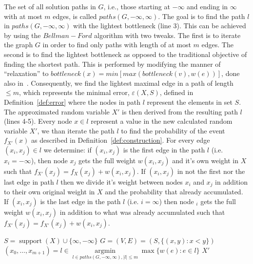 \documentclass{article}
\DeclareMathOperator{\support}{support}
\DeclareMathOperator{\KlmApprox}{KolmogorovApprox}
\begin{document}
The set of all solution paths in $G$, i.e., those starting at $-\infty$ and ending in $\infty$ with at most $m$ edges, is called $paths(G, -\infty, \infty)$. The goal is to find the path $l$ in $paths(G, -\infty, \infty)$ with the lightest bottleneck (line 3). This can be achieved by using the $Bellman-Ford$ algorithm with two tweaks. The first is to iterate the graph $G$ in order to find only paths with length of at most $m$ edges. The second is to find the lightest bottleneck as opposed to the traditional objective of finding the shortest path. This is performed by modifying the manner of ``relaxation'' to $bottleneck(x) = min[max(bottleneck(v),w(e))]$, done also in~\cite{shufan2011two}. Consequently, we find the lightest maximal edge in a path of length $\leq m$, which represents the minimal error, $\varepsilon(X,S)$, defined in Definition~\ref{def:error} where the nodes in path $l$ represent the elements in set $S$. The approximated random variable $X'$ is then derived from the resulting path $l$ (lines 4-5). Every node $x\in l$ represent a value in the new calculated random variable $X'$, we than iterate the path $l$ to find the probability of the event $f_{X'}(x)$ as described in Definition~\ref{def:construction}. For every edge $(x_i,x_j)\in l$ we determine: if $(x_i,x_j)$ is the first edge in the path $ l$ (i.e.  $x_i=-\infty$), then node $x_j$ gets the full weight $w(x_i,x_j)$ and it's own weight in $X$ such that $f_{X'}(x_j) = f_{X}(x_j) +  w(x_i,x_j)$. If $(x_i,x_j)$ in not the first nor the last edge in path $l$ then we divide it's weight between nodes $x_i$ and $x_j$ in addition to their own original weight in $X$ and the probability that already accumulated. If $(x_i,x_j)$ is the last edge in the path $ l$ (i.e.  $i=\infty$) then node $_i$ gets the full weight $w(x_i,x_j)$ in addition to what was already accumulated such that $f_{X'}(x_j) = f_{X'}(x_j) +  w(x_i,x_j)$.



\begin{algorithm}\label{alg:optapprox}
	\DontPrintSemicolon
	$S = \support(X)\cup \{\infty,-\infty\}$\;
	$G=(V,E)=(S, \{ (x,y)  \colon  x<y \})$  \;
	$(x_0,\dots,x_{m+1}) = l \in \operatorname{argmin}\limits_{l \in paths(G,-\infty,\infty),|l|\leq m}  \max \{ w(e)\colon e \in l  \}$  \;
	\Return $X'$\;
	
	\caption{$\KlmApprox (X, m)$}  
	\label{alg:sequence}
\end{algorithm}
\end{document}
